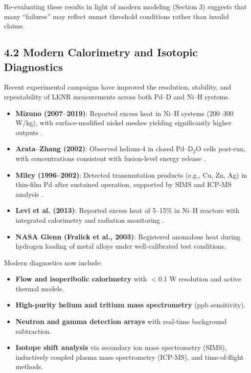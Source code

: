     Re-evaluating these results in light of modern modeling (Section 3) suggests that many “failures” may reflect unmet threshold conditions rather than invalid claims.
    
    \subsection{4.2 Modern Calorimetry and Isotopic Diagnostics}
    
    Recent experimental campaigns have improved the resolution, stability, and repeatability of LENR measurements across both Pd–D and Ni–H systems.
    
    \begin{itemize}
        \item \textbf{Mizuno (2007–2019)}: Reported excess heat in Ni–H systems (200–300 W/kg), with surface-modified nickel meshes yielding significantly higher outputs \cite{mizuno2007, mizuno2019}.
        
        \item \textbf{Arata–Zhang (2002)}: Observed helium-4 in closed Pd–D$_2$O cells post-run, with concentrations consistent with fusion-level energy release \cite{arata2002}.
        
        \item \textbf{Miley (1996–2002)}: Detected transmutation products (e.g., Cu, Zn, Ag) in thin-film Pd after sustained operation, supported by SIMS and ICP-MS analysis \cite{miley1996}.
        
        \item \textbf{Levi et al. (2013)}: Reported excess heat of 5–15\% in Ni–H reactors with integrated calorimetry and radiation monitoring \cite{levi2013}.
        
        \item \textbf{NASA Glenn (Fralick et al., 2003)}: Registered anomalous heat during hydrogen loading of metal alloys under well-calibrated test conditions.
    \end{itemize}
    
    Modern diagnostics now include:
    
    \begin{itemize}
        \item \textbf{Flow and isoperibolic calorimetry} with $<$0.1 W resolution and active thermal models.
        \item \textbf{High-purity helium and tritium mass spectrometry} (ppb sensitivity).
        \item \textbf{Neutron and gamma detection arrays} with real-time background subtraction.
        \item \textbf{Isotope shift analysis} via secondary ion mass spectrometry (SIMS), inductively coupled plasma mass spectrometry (ICP-MS), and time-of-flight methods.
    \end{itemize}
    
